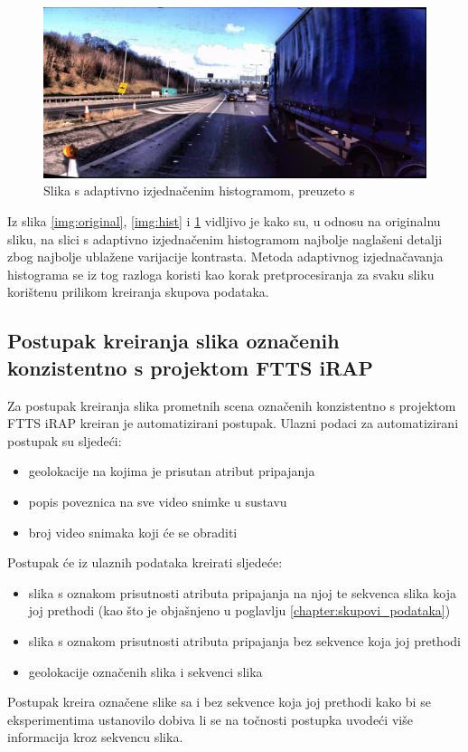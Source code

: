\documentclass[times, utf8, diplomski, numeric]{fer}
\begin{document}
\begin{figure}[H]
\centering
\includegraphics[scale=0.2]{images/adapt_hist.png}
\caption{Slika s adaptivno izjednačenim histogramom, preuzeto s \citep{url:ftts_irap}}
\label{img:adapt_hist}
\end{figure}

Iz slika \ref{img:original}, \ref{img:hist} i \ref{img:adapt_hist} vidljivo je kako su, u odnosu na originalnu sliku, na slici s adaptivno izjednačenim histogramom najbolje naglašeni detalji zbog najbolje ublažene varijacije kontrasta.
Metoda adaptivnog izjednačavanja histograma se iz tog razloga koristi kao korak pretprocesiranja za svaku sliku korištenu prilikom kreiranja skupova podataka.

\subsection{Postupak kreiranja slika označenih konzistentno s projektom FTTS iRAP}
Za postupak kreiranja slika prometnih scena označenih konzistentno s projektom FTTS iRAP kreiran je automatizirani postupak.
Ulazni podaci za automatizirani postupak su sljedeći:
\begin{itemize}
 \item geolokacije na kojima je prisutan atribut pripajanja
 \item popis poveznica na sve video snimke u sustavu \citep{url:ftts_irap}
 \item broj video snimaka koji će se obraditi
\end{itemize}
Postupak će iz ulaznih podataka kreirati sljedeće:
\begin{itemize}
 \item slika s oznakom prisutnosti atributa pripajanja na njoj te sekvenca slika koja joj prethodi (kao što je objašnjeno u poglavlju \ref{chapter:skupovi_podataka})
 \item slika s oznakom prisutnosti atributa pripajanja bez sekvence koja joj prethodi
 \item geolokacije označenih slika i sekvenci slika
\end{itemize}
\noindent Postupak kreira označene slike sa i bez sekvence koja joj prethodi kako bi se eksperimentima ustanovilo dobiva li se na točnosti postupka uvodeći više informacija kroz sekvencu slika.
\end{document}
